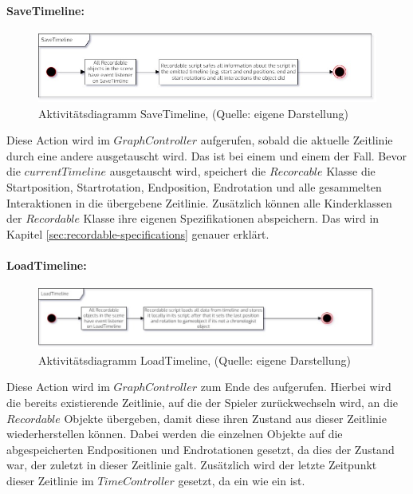 \paragraph{SaveTimeline:}

\begin{figure}[ht]
\centering
\includegraphics[width=1\linewidth]{content/pictures/SaveTImeline_uml.jpg}
\caption{Aktivitätsdiagramm SaveTimeline, (Quelle: eigene Darstellung)}
\label{fig:save_timeline-cs}
\end{figure}

Diese Action wird im $GraphController$ aufgerufen, sobald die aktuelle Zeitlinie durch eine andere ausgetauscht wird. Das ist bei einem  und einem  der Fall. Bevor die $currentTimeline$ ausgetauscht wird, speichert die $Recorcable$ Klasse die Startposition, Startrotation, Endposition, Endrotation und alle gesammelten Interaktionen in die übergebene Zeitlinie. Zusätzlich können alle Kinderklassen der $Recordable$ Klasse ihre eigenen Spezifikationen abspeichern. Das wird in Kapitel \ref{sec:recordable-specifications} genauer erklärt.

\paragraph{LoadTimeline:}

\begin{figure}[ht]
\centering
\includegraphics[width=1\linewidth]{content/pictures/LoadTimeline_uml.jpg}
\caption{Aktivitätsdiagramm LoadTimeline, (Quelle: eigene Darstellung)}
\label{fig:load_timeline-cs}
\end{figure}

Diese Action wird im $GraphController$ zum Ende des  aufgerufen. Hierbei wird die bereits existierende Zeitlinie, auf die der Spieler zurückwechseln wird, an die $Recordable$ Objekte übergeben, damit diese ihren Zustand aus dieser Zeitlinie wiederherstellen können. Dabei werden die einzelnen Objekte auf die abgespeicherten Endpositionen und Endrotationen gesetzt, da dies der Zustand war, der zuletzt in dieser Zeitlinie galt. 
Zusätzlich wird der letzte Zeitpunkt dieser Zeitlinie im $TimeController$ gesetzt, da ein  wie ein  ist.

